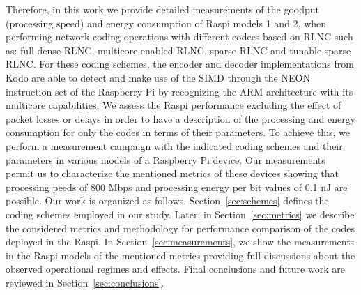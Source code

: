 Therefore, in this work we provide detailed measurements of the goodput (processing
speed) and energy consumption of \ac{Raspi} models 1 and 2, when
performing network coding operations with different codecs based on \ac{RLNC}
such as: full dense \ac{RLNC}, multicore enabled \ac{RLNC}, sparse \ac{RLNC}
and tunable sparse \ac{RLNC}. For these coding schemes, the encoder and decoder
implementations from Kodo are able to detect and make use of the \ac{SIMD}
through the NEON instruction set of the Raspberry Pi by recognizing the \ac{ARM}
architecture with its multicore capabilities. We assess
the \ac{Raspi} performance excluding the effect of packet losses or delays in
order to have a description of the processing and energy consumption for only the
codes in terms of their parameters. To achieve this, we perform a measurement
campaign with the indicated coding schemes and their parameters in various models
of a Raspberry Pi device. Our measurements permit us to characterize the mentioned
metrics of these devices showing that processing peeds of 800 Mbps and processing
energy per bit values of 0.1 nJ are possible. Our work is organized as follows.
Section~\ref{sec:schemes} defines the
coding schemes employed in our study. Later, in Section~\ref{sec:metrics}
we describe the considered metrics and methodology for performance comparison
of the codes deployed in the \ac{Raspi}. In Section~\ref{sec:measurements}, we
show the measurements in the \ac{Raspi} models of the mentioned metrics
providing full discussions about the observed operational regimes and effects.
Final conclusions and future work are reviewed in
Section~\ref{sec:conclusions}.

